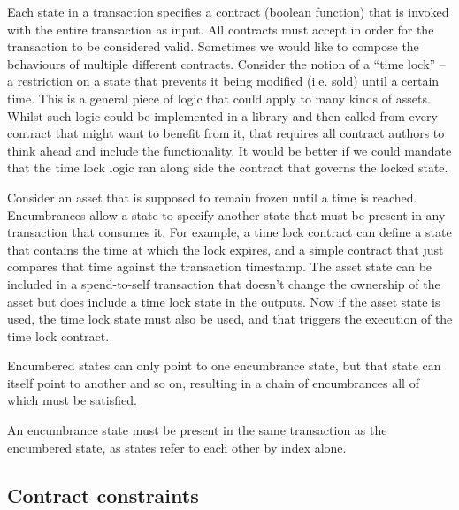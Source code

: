 \documentclass{article}
\begin{document}
Each state in a transaction specifies a contract (boolean function) that is invoked with the entire transaction as input. All contracts must accept
in order for the transaction to be considered valid. Sometimes we would like to compose the behaviours of multiple
different contracts. Consider the notion of a ``time lock'' -- a restriction on a state that prevents it being
modified (i.e. sold) until a certain time. This is a general piece of logic that could apply to many kinds of
assets. Whilst such logic could be implemented in a library and then called from every contract that might want
to benefit from it, that requires all contract authors to think ahead and include the functionality. It would be
better if we could mandate that the time lock logic ran along side the contract that governs the locked state.

Consider an asset that is supposed to remain frozen until a time is reached. Encumbrances allow a state to specify another
state that must be present in any transaction that consumes it. For example, a time lock contract can define a state that
contains the time at which the lock expires, and a simple contract that just compares that time against the transaction
timestamp. The asset state can be included in a spend-to-self transaction that doesn't change the ownership of the asset
but does include a time lock state in the outputs. Now if the asset state is used, the time lock state must also be used, and
that triggers the execution of the time lock contract.

Encumbered states can only point to one encumbrance state, but that state can itself point to another and so on,
resulting in a chain of encumbrances all of which must be satisfied.


An encumbrance state must be present in the same transaction as the encumbered state, as states refer to each other
by index alone.


\subsection{Contract constraints}\label{sec:contract-constraints}
\end{document}
